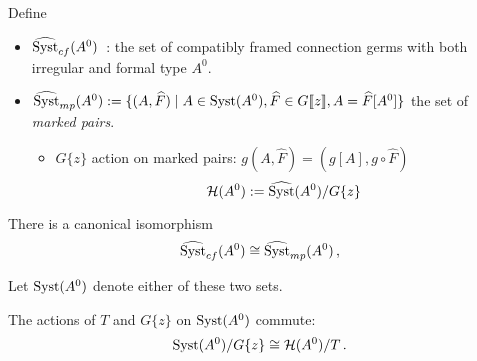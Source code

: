 \begin{defn} Define
  \begin{itemize}
    \item $\widehat{\operatorname{Syst}}_{cf}(A^0)$~:\Leftrightarrow{} the set of compatibly
      framed connection germs with both irregular and formal type $A^0$.
    \item $\widehat{\operatorname{Syst}}_{mp}(A^0):=\{(A,\widehat{F})\mid A\in\operatorname{Syst}(A^0)
      ,\widehat{F}\in G\llbracket z\rrbracket
      ,A=\widehat{F}[A^0]\}$
      the set of \emph{marked pairs}.
      \begin{itemize}
        \item $G\{z\}$ action on marked pairs:
          $g(A,\hat{F})=(g[A],g\circ\hat{F})$
          \[
            \mathcal{H}(A^0):=\widehat{\operatorname{Syst}}(A^0)/G\{z\}
          \]
      \end{itemize}
  \end{itemize}

  \begin{lem}
    There is a canonical isomorphism
    \[
      \widehat{\operatorname{Syst}}_{cf}(A^0)\cong\widehat{\operatorname{Syst}}_{mp}(A^0) \,,
    \]
  \end{lem}
  Let $\operatorname{Syst}(A^0)$ denote either of these two sets.
\end{defn}
\begin{lem}
The actions of $T$ and $G\{z\}$ on $\operatorname{Syst}(A^0)$ commute:
\[
  \operatorname{Syst}(A^0)/G\{z\}\cong\mathcal{H}(A^0)/T \,.
\]
\end{lem}

